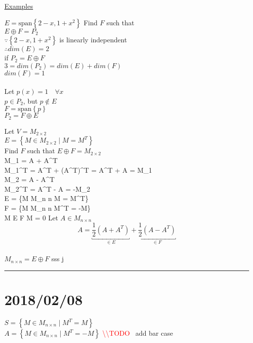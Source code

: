 \documentclass[12pt]{article}
\newcommand{\uu}[1]{\underbracket{#1}}
\newcommand{\todo}[0]{\textcolor{red}{\textbackslash\textbackslash TODO \ }}
\newenvironment{examples}{\shownto{-,compact}\underline{Examples}\enumerate}{\endenumerate\divider\endshownto}
\newcommand{\bb}[1]{\left\{#1\right\}}
\newcommand{\pp}[1]{\left(#1\right)}
\newcommand{\divider}[0]{\textcolor{lightgray}{\rule{\textwidth}{0.1pt}}}
\newcommand{\sspan}[1]{\text{span}\bb{#1}}
\newenvironment{eqn}{\equation\alignedat{3}}{\endalignedat\endequation}
\begin{document}
\begin{examples}
	\item $E = \sspan{2 - x, 1 + x^2}$ \qquad Find $F$ such that \\
	$E \oplus F = P_2$ \\
	$\because \bb{2 - x, 1 + x^2}$ is linearly independent \\
	$\therefore dim(E) = 2$ \\
	if $P_2 = E \oplus F$ \\ 
	$3 = dim(P_2) = dim(E) + dim(F)$ \\
	$dim(F) = 1$ \\\\
	Let $p(x) = 1 \quad \forall x$ \\
	$p \in P_2$, but $p \notin E$ \\
	$F = \sspan{p}$ \\
	$P_2 = F \oplus E$
	
	\item Let $V = M_{2 \times 2}$ \\
	$E = \bb{M \in M_{2 \times 2} \mid M = M^T}$ \\
	Find $F$ such that $E \oplus F = M_{2 \times 2}$ \\
	
	\begin{eqn}
		M_1 = A + A^T \\
		M_1^T = A^T + \pp{A^T}^T = A^T + A = M_1 \\
		M_2 = A - A^T \\
		M_2^T = A^T - A = -M_2 \\
		E = \bb{M \in M_{n \times n} \mid M = M^T} \\
		F = \bb{M \in M_{n \times n} \mid M^T = -M} \\
		M \in E \cap F \Rightarrow M = 0 
	\end{eqn}
	Let $A \in M_{n \times n}$ \\
	$$A = \uu{\frac{1}{2} (A + A^T)}_{\in E} + \uu{\frac{1}{2} (A - A^T)}_{\in F}$$ \\
	$M_{n \times n} = E \oplus F$
sss	j
\end{examples}


\section{2018/02/08}

$S = \bb{M \in M_{n \times n} \mid M^T = M}$ \\
$A = \bb{M \in M_{n \times n} \mid M^T = -M}$
\todo add bar case
\end{document}
